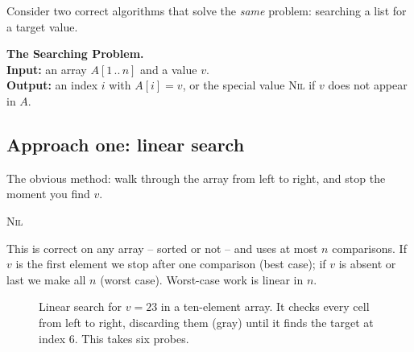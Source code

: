 Consider two correct algorithms that solve the \emph{same} problem: searching a list for a target value.

\begin{formalbox}
\textbf{The Searching Problem.}\\
\textbf{Input:} an array $A[1\,..\,n]$ and a value $v$.\\
\textbf{Output:} an index $i$ with $A[i] = v$, or the special value
\textsc{Nil} if $v$ does not appear in $A$.
\end{formalbox}

\subsection{Approach one: linear search}

The obvious method: walk through the array from left to right, and stop the moment
you find $v$.

\begin{algorithm}[H]
\caption{\textsc{Linear-Search}}
\Return \textsc{Nil}\;
\end{algorithm}

This is correct on any array -- sorted or not -- and uses at most $n$ comparisons. If
$v$ is the first element we stop after one comparison (best case); if $v$ is absent
or last we make all $n$ (worst case). Worst-case work is linear in $n$.
\begin{figure}[H]
\centering
{}
\caption{Linear search for $v = 23$ in a ten-element array. It checks every cell from left to right, discarding them (gray) until it finds the target at index 6. This takes six probes.}
\label{ch01:linear-scan}
\end{figure}

